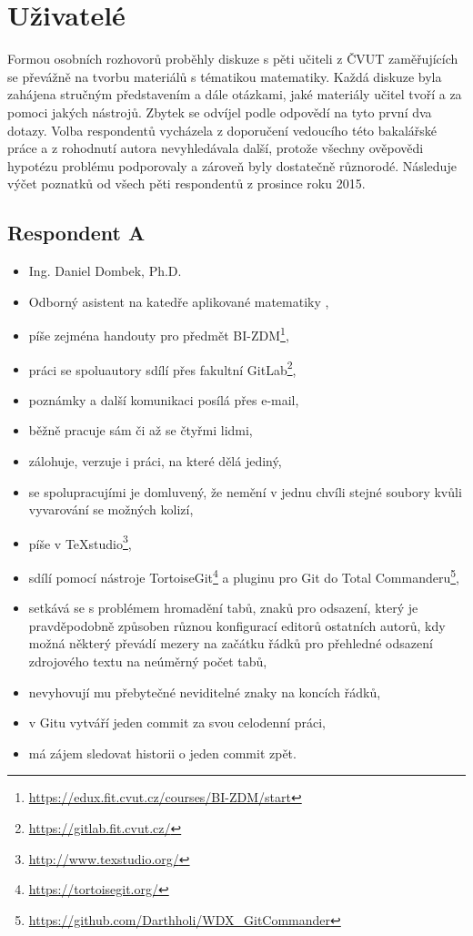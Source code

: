 \section{Uživatelé}

Formou osobních rozhovorů proběhly diskuze s pěti učiteli z ČVUT zaměřujících se převážně na tvorbu materiálů s tématikou matematiky. Každá diskuze byla zahájena stručným představením a dále otázkami, jaké materiály učitel tvoří a za pomoci jakých nástrojů. Zbytek se odvíjel podle odpovědí na tyto první dva dotazy. Volba respondentů vycházela z doporučení vedoucího této bakalářské práce a z rohodnutí autora nevyhledávala další, protože všechny ověpovědi hypotézu problému podporovaly a zároveň byly dostatečně různorodé. Následuje výčet poznatků od všech pěti respondentů z prosince roku 2015.

\subsection{Respondent A}

\begin{itemize}
	\item Ing. Daniel Dombek, Ph.D.
	\item Odborný asistent na katedře aplikované matematiky \cite{kam},
	\item píše zejména handouty pro předmět BI-ZDM\footnote{\url{https://edux.fit.cvut.cz/courses/BI-ZDM/start}},
	\item práci se spoluautory sdílí přes fakultní GitLab\footnote{\url{https://gitlab.fit.cvut.cz/}},
	\item poznámky a další komunikaci posílá přes e-mail,
	\item běžně pracuje sám či až se čtyřmi lidmi,
	\item zálohuje, verzuje i práci, na které dělá jediný,
	\item se spolupracujími je domluvený, že nemění v jednu chvíli stejné soubory kvůli vyvarování se možných kolizí,
	\item píše v TeXstudio\footnote{\url{http://www.texstudio.org/}},
	\item sdílí pomocí nástroje TortoiseGit\footnote{\url{https://tortoisegit.org/}} a pluginu pro Git do Total Commanderu\footnote{\url{https://github.com/Darthholi/WDX\_GitCommander}},
	\item setkává se s problémem hromadění tabů, znaků pro odsazení, který je pravděpodobně způsoben různou konfigurací editorů ostatních autorů, kdy možná některý převádí mezery na začátku řádků pro přehledné odsazení zdrojového textu na neúměrný počet tabů,
	\item nevyhovují mu přebytečné neviditelné znaky na koncích řádků,
	\item v Gitu vytváří jeden commit za svou celodenní práci,
	\item má zájem sledovat historii o jeden commit zpět.
\end{itemize}


